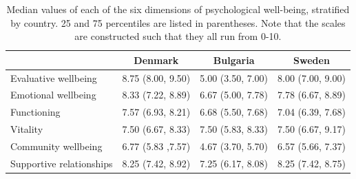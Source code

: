 \documentclass[titlepage,11pt,twoside]{article}
\begin{document}
\begin{table}[t]
\centering
\begin{tabular}{lccc}
  \hline
  & Denmark & Bulgaria & Sweden \\
  \hline
 Evaluative wellbeing & 8.75 (8.00, 9.50) & 5.00 (3.50, 7.00) & 8.00 (7.00, 9.00) \\
 Emotional wellbeing & 8.33 (7.22, 8.89) & 6.67 (5.00, 7.78) & 7.78 (6.67, 8.89) \\
Functioning & 7.57 (6.93, 8.21) & 6.68 (5.50, 7.68) & 7.04 (6.39, 7.68) \\
Vitality & 7.50 (6.67, 8.33) & 7.50 (5.83, 8.33) & 7.50 (6.67, 9.17) \\
 Community wellbeing & 6.77 (5.83 ,7.57) & 4.67 (3.70, 5.70) & 6.57 (5.66, 7.37) \\
Supportive relationships & 8.25 (7.42, 8.92) & 7.25 (6.17, 8.08) & 8.25 (7.42, 8.75) \\
   \hline
\end{tabular}

\caption{Median values of each of the six dimensions of psychological well-being, stratified by country. 25 and 75 percentiles are listed in parentheses. Note that the scales are constructed such that they all run from 0-10.}
\label{tableDistr}
\end{table}
\end{document}

